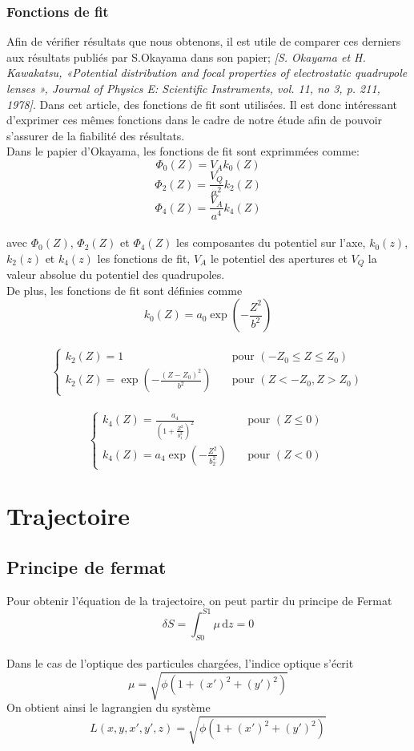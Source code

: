 \documentclass{article}
\begin{document}
\subsubsection{Fonctions de fit}
Afin de vérifier résultats que nous obtenons, il est utile de comparer ces derniers aux résultats publiés par S.Okayama dans son papier;
\textit{[S. Okayama et H. Kawakatsu, «Potential distribution and focal properties of electrostatic quadrupole lenses », 
Journal of Physics E: Scientific Instruments, vol. 11, no 3, p. 211, 1978]}. Dans cet article, des fonctions de 
fit sont utilisées. Il est donc intéressant d'exprimer ces mêmes fonctions dans le cadre de notre étude 
afin de pouvoir s'assurer de la fiabilité des résultats. 
\
\\
Dans le papier d'Okayama, les fonctions de fit sont exprimmées comme:
\
\\
\[
\Phi_0(Z)=V_A k_0 (Z) 
\]
\[ 
\Phi_2(Z)=\frac{V_Q}{a^2} k_2 (Z) 
\]
\[
\Phi_4(Z)=\frac{V_A}{a^4} k_4 (Z)
\]
\
\\
avec $\Phi_0(Z)$, $\Phi_2(Z)$ et $\Phi_4(Z)$ les composantes du potentiel sur l'axe, $k_0(z)$, $k_2(z)$ et $k_4(z)$
les fonctions de fit, $V_A$ le potentiel des apertures et $V_Q$ la valeur absolue du potentiel des quadrupoles. 
\\
De plus, les fonctions de fit sont définies comme 
\
\\

\[
k_0 (Z)=a_0 \exp{\left(- \frac{Z^2}{b^2}\right)}
\]
\
\\
\[
\left\{
  \begin{array} {ll}
    k_2 (Z)=1 \quad & \mbox{pour } (-Z_0\leq Z\leq Z_0)
    \
    \\
    k_2 (Z)=\exp{\left(- \frac{(Z-Z_0)^2}{b^2}\right)} \quad & \mbox{pour } (Z<-Z_0, Z>Z_0)
  \end{array}
\right.
\]
\
\\
\[
\left\{
  \begin{array} {ll}
    k_4 (Z)=\frac{a_4}{\left(1+\frac{Z^2}{b_1 ^2}\right)^2} \quad & \mbox{pour } (Z\leq 0)
    \
    \\
    k_4 (Z)=a_4 \exp{\left(- \frac{Z^2}{b_2 ^2}\right)} \quad & \mbox{pour } (Z < 0)
  \end{array}
\right.
\]

\section{Trajectoire}

\subsection{Principe de fermat}
Pour obtenir l'équation de la trajectoire, on peut partir du principe de Fermat 
\[
\delta S = \int_{S0}^{S1} \mu\,\mathrm{d}z = 0
\]
\\
Dans le cas de l'optique des particules chargées, l'indice optique s'écrit 
\[
\mu = \sqrt{\phi(1+(x')^2 + (y')^2)}
\]
On obtient ainsi le lagrangien du système 
\[
L(x,y,x',y',z)= \sqrt{\phi(1+(x')^2 + (y')^2)}
\]
\end{document}
